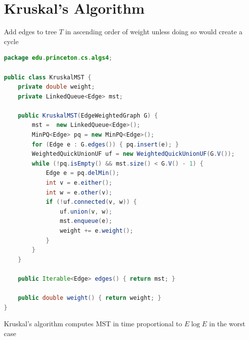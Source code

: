 \documentclass[8pt,a4paper,compress]{beamer}
\begin{document}
\section{Kruskal's Algorithm}
\begin{frame}[fragile]
\pause

Add edges to tree $T$ in ascending order of weight unless doing so would create a cycle

\pause
\bigskip

\begin{lstlisting}[language=Java]
package edu.princeton.cs.algs4;

public class KruskalMST {
    private double weight;  
    private LinkedQueue<Edge> mst;
    
    public KruskalMST(EdgeWeightedGraph G) {
        mst =  new LinkedQueue<Edge>();  
        MinPQ<Edge> pq = new MinPQ<Edge>();
        for (Edge e : G.edges()) { pq.insert(e); }
        WeightedQuickUnionUF uf = new WeightedQuickUnionUF(G.V());
        while (!pq.isEmpty() && mst.size() < G.V() - 1) {
            Edge e = pq.delMin();
            int v = e.either();
            int w = e.other(v);
            if (!uf.connected(v, w)) { 
                uf.union(v, w); 
                mst.enqueue(e); 
                weight += e.weight();
            }
        }
    }

    public Iterable<Edge> edges() { return mst; }

    public double weight() { return weight; }
}
\end{lstlisting}

\pause
\bigskip

Kruskal's algorithm computes MST in time proportional to
$E \log E$ in the worst case
\end{frame}
\end{document}
